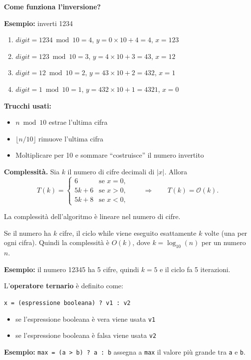 \documentclass[a4paper, 11pt]{article}
\theoremstyle{definition}
\theoremstyle{remark}
\theoremstyle{remark}
\newenvironment{nota}{%
	\begin{tcolorbox}[
		colback=codebg,
		colframe=primary,
		fonttitle=\bfseries,
		title=Nota,
		left=6pt, right=6pt, top=4pt, bottom=4pt
		]
	}{%
	\end{tcolorbox}
}
\begin{document}
	\begin{softnote}
		\textbf{Come funziona l'inversione?}
		
		\textbf{Esempio:} inverti 1234
		\begin{enumerate}
			\item $digit = 1234 \bmod 10 = 4$, $y = 0 \times 10 + 4 = 4$, $x = 123$
			\item $digit = 123 \bmod 10 = 3$, $y = 4 \times 10 + 3 = 43$, $x = 12$
			\item $digit = 12 \bmod 10 = 2$, $y = 43 \times 10 + 2 = 432$, $x = 1$
			\item $digit = 1 \bmod 10 = 1$, $y = 432 \times 10 + 1 = 4321$, $x = 0$
		\end{enumerate}
		
		\textbf{Trucchi usati:}
		\begin{itemize}
			\item $n \bmod 10$ estrae l'ultima cifra
			\item $\lfloor n / 10 \rfloor$ rimuove l'ultima cifra
			\item Moltiplicare per 10 e sommare ``costruisce'' il numero invertito
		\end{itemize}
	\end{softnote}
	
	\textbf{Complessità.}
	Sia $k$ il numero di cifre decimali di $|x|$. Allora
	\[
	T(k) =
	\begin{cases}
		6       & \text{se } x = 0,\\
		5k + 6  & \text{se } x > 0,\\
		5k + 8  & \text{se } x < 0,
	\end{cases}
	\qquad\Rightarrow\qquad
	T(k) = \mathcal{O}(k).
	\]
	
	\begin{center}
		La complessità dell'algoritmo è lineare nel numero di cifre.
	\end{center}
	
	\begin{nota}
		Se il numero ha $k$ cifre, il ciclo while viene eseguito esattamente $k$ volte (una per ogni cifra). Quindi la complessità è $O(k)$, dove $k = \log_{10}(n)$ per un numero $n$.
		
		\textbf{Esempio:} il numero 12345 ha 5 cifre, quindi $k=5$ e il ciclo fa 5 iterazioni.
	\end{nota}
	
	
	\begin{nota}
		L'\textbf{operatore ternario} è definito come:
		
		\texttt{x = (espressione booleana) ? v1 : v2}
		
		\begin{itemize}
			\item se l'espressione booleana è vera viene usata \texttt{v1}
			\item se l'espressione booleana è falsa viene usata \texttt{v2}
		\end{itemize}
		
		\textbf{Esempio:} \texttt{max = (a > b) ? a : b} assegna a \texttt{max} il valore più grande tra \texttt{a} e \texttt{b}.
	\end{nota}
	
\end{document}
